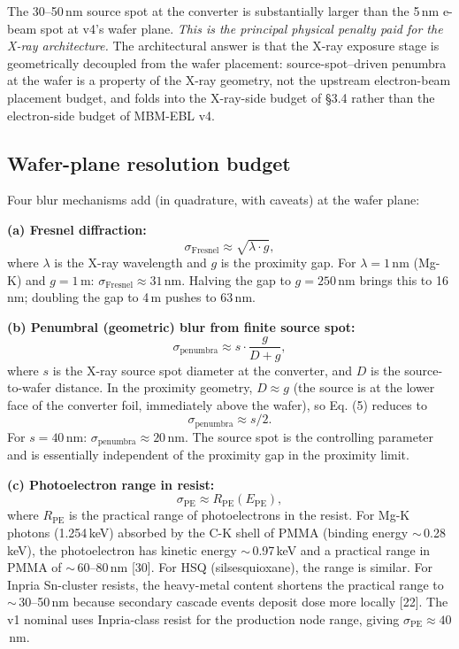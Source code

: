 \documentclass[11pt,letterpaper]{article}
\begin{document}
The 30--50\,nm source spot at the converter is substantially larger than the 5\,nm e-beam spot at v4's wafer plane. \textit{This is the principal physical penalty paid for the X-ray architecture.} The architectural answer is that the X-ray exposure stage is geometrically decoupled from the wafer placement: source-spot--driven penumbra at the wafer is a property of the X-ray geometry, not the upstream electron-beam placement budget, and folds into the X-ray-side budget of \S 3.4 rather than the electron-side budget of MBM-EBL v4.

\subsection{Wafer-plane resolution budget}

Four blur mechanisms add (in quadrature, with caveats) at the wafer plane:

\textbf{(a) Fresnel diffraction:}
\begin{equation}
\sigma_\text{Fresnel} \approx \sqrt{\lambda \cdot g},
\end{equation}
where $\lambda$ is the X-ray wavelength and $g$ is the proximity gap. For $\lambda = 1$\,nm (Mg-K) and $g = 1$\,\textmu m: $\sigma_\text{Fresnel} \approx 31$\,nm. Halving the gap to $g = 250$\,nm brings this to 16\,nm; doubling the gap to 4\,\textmu m pushes to 63\,nm.

\textbf{(b) Penumbral (geometric) blur from finite source spot:}
\begin{equation}
\sigma_\text{penumbra} \approx s \cdot \frac{g}{D + g},
\end{equation}
where $s$ is the X-ray source spot diameter at the converter, and $D$ is the source-to-wafer distance. In the proximity geometry, $D \approx g$ (the source is at the lower face of the converter foil, immediately above the wafer), so Eq. (5) reduces to
$$\sigma_\text{penumbra} \approx s/2.$$
For $s = 40$\,nm: $\sigma_\text{penumbra} \approx 20$\,nm. The source spot is the controlling parameter and is essentially independent of the proximity gap in the proximity limit.

\textbf{(c) Photoelectron range in resist:}
\begin{equation}
\sigma_\text{PE} \approx R_\text{PE}(E_\text{PE}),
\end{equation}
where $R_\text{PE}$ is the practical range of photoelectrons in the resist. For Mg-K photons (1.254\,keV) absorbed by the C-K shell of PMMA (binding energy $\sim$\,0.28\,keV), the photoelectron has kinetic energy $\sim$\,0.97\,keV and a practical range in PMMA of $\sim$\,60--80\,nm [30]. For HSQ (silsesquioxane), the range is similar. For Inpria Sn-cluster resists, the heavy-metal content shortens the practical range to $\sim$\,30--50\,nm because secondary cascade events deposit dose more locally [22]. The v1 nominal uses Inpria-class resist for the production node range, giving $\sigma_\text{PE} \approx 40$\,nm.
\end{document}
